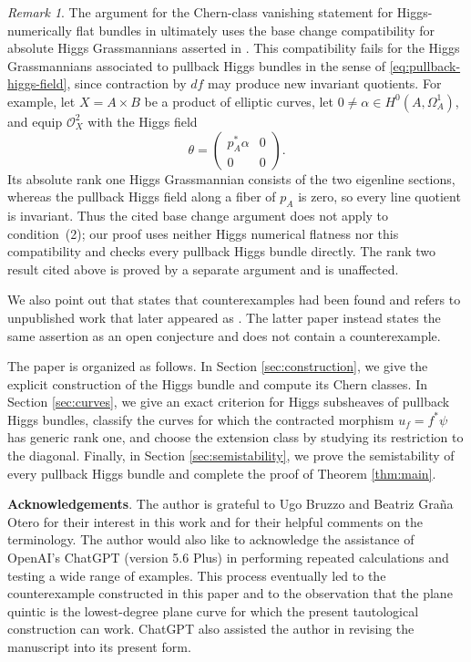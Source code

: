 \documentclass[oneside,11pt]{amsart}
\theoremstyle{definition}
\theoremstyle{remark}
\newtheorem{rem}[thm]{Remark}
\numberwithin{thm}{section}
\numberwithin{equation}{section}
\begin{document}
\begin{rem}\label{rem:history}
The argument for the Chern-class vanishing statement for Higgs-numerically flat bundles in \cite[Corollary~3.2]{BGO07} ultimately uses the base change compatibility for absolute Higgs Grassmannians asserted in \cite[Step 1 in the proof of Theorem 1.3]{BHR06}.  This compatibility fails for the Higgs Grassmannians associated to pullback Higgs bundles in the sense of \eqref{eq:pullback-higgs-field}, since contraction by $df$ may produce new invariant quotients.  For example, let $X=A\times B$ be a product of elliptic curves, let $0\neq\alpha\in H^0(A,\Omega_A^1)$, and equip $\mathcal{O}_X^2$ with the Higgs field
\[
 \theta=\begin{pmatrix}p_A^*\alpha&0\\0&0\end{pmatrix}.
\]
Its absolute rank one Higgs Grassmannian consists of the two eigenline sections, whereas the pullback Higgs field along a fiber of $p_A$ is zero, so every line quotient is invariant.  Thus the cited base change argument does not apply to condition~(2); our proof uses neither Higgs numerical flatness nor this compatibility and checks every pullback Higgs bundle directly.  The rank two result cited above is proved by a separate argument and is unaffected.


We also point out that \cite[Introduction]{BLG16} states that counterexamples had been found and refers to unpublished work that later appeared as \cite{BBG19}.  The latter paper instead states the same assertion as an open conjecture and does not contain a counterexample.
\end{rem}


The paper is organized as follows.  In Section \ref{sec:construction}, we give the explicit construction of the Higgs bundle and compute its Chern classes.  In Section \ref{sec:curves}, we give an exact criterion for Higgs subsheaves of pullback Higgs bundles, classify the curves for which the contracted morphism $u_f=f^*\psi$ has generic rank one, and choose the extension class by studying its restriction to the diagonal. Finally, in Section \ref{sec:semistability}, we prove the semistability of every pullback Higgs bundle and complete the proof of Theorem \ref{thm:main}.


\vspace{5mm}

\textbf{Acknowledgements}.
The author is grateful to Ugo Bruzzo and Beatriz Gra\~na Otero
for their interest in this work and for their helpful comments
on the terminology. The author would also like to acknowledge the assistance of OpenAI's ChatGPT (version 5.6 Plus) in performing repeated calculations and testing a wide range of examples. This process eventually led to the counterexample constructed in this paper and to the observation that the plane quintic is the lowest-degree plane curve for which the present tautological construction can work. ChatGPT also assisted the author in revising the manuscript into its present form.
\end{document}
